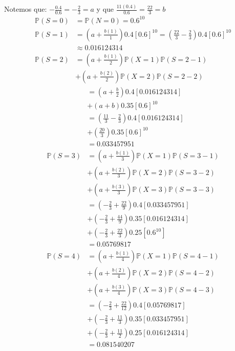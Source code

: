\documentclass[
]{article}
\begin{document}
Notemos que: \(-\frac{0.4}{0.6} = -\frac{2}{3} = a\) y que
\(\frac{11(0.4)}{0.6} = \frac{22}{3} = b\) \begin{align*}
\mathbb{P}(S = 0) &= \mathbb{P}(N = 0) = 0.6^{10}\\
\mathbb{P}(S = 1) &= \left(a + \frac{b(1)}{1}\right)0.4[0.6]^{10} = \left(\frac{22}{3} - \frac{2}{3}\right)0.4[0.6]^{10}\\
&\approx 0.016124314\\
\mathbb{P}(S = 2) &= \left(a + \frac{b(1)}{2}\right)\mathbb{P}(X = 1)\mathbb{P}(S = 2 - 1)\\
&+  \left(a + \frac{b(2)}{2}\right)\mathbb{P}(X = 2)\mathbb{P}(S = 2 - 2)
\end{align*} \begin{align*}
&=(a + \frac{b}{2})0.4[0.016124314]\\
&+ (a + b)0.35[0.6]^{10}\\
&= (\frac{11}{3} - \frac{2}{3})0.4[0.016124314]\\
&+ (\frac{20}{3})0.35[0.6]^{10}\\
&= 0.033457951\\
\mathbb{P}(S = 3) &= \left(a + \frac{b(1)}{3}\right)\mathbb{P}(X = 1)\mathbb{P}(S = 3 - 1)\\
&+  \left(a + \frac{b(2)}{3}\right)\mathbb{P}(X = 2)\mathbb{P}(S = 3 - 2)\\
&+ \left(a + \frac{b(3)}{3}\right)\mathbb{P}(X = 3)\mathbb{P}(S = 3 - 3)\\
&= \left(-\frac{2}{3} + \frac{22}{9}\right)0.4[0.033457951]\\
&+ \left(-\frac{2}{3} + \frac{44}{9}\right)0.35[0.016124314]\\
&+ \left(-\frac{2}{3} + \frac{22}{3}\right)0.25[0.6^{10}]\\
&= 0.05769817\\
\mathbb{P}(S = 4) &= \left(a + \frac{b(1)}{4}\right)\mathbb{P}(X = 1)\mathbb{P}(S = 4 - 1)\\
&+  \left(a + \frac{b(2)}{4}\right)\mathbb{P}(X = 2)\mathbb{P}(S = 4 - 2)\\
&+ \left(a + \frac{b(3)}{4}\right)\mathbb{P}(X = 3)\mathbb{P}(S = 4 - 3)\\
&= \left(-\frac{2}{3} + \frac{22}{12}\right)0.4[0.05769817]\\
&+ \left(-\frac{2}{3} + \frac{11}{3}\right)0.35[0.033457951]\\
&+ \left(-\frac{2}{3} + \frac{11}{2}\right)0.25[0.016124314]\\
&= 0.081540207\\

\end{align*}
\end{document}
